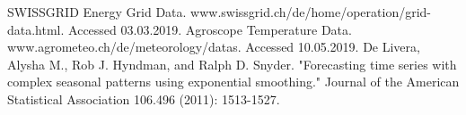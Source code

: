 \documentclass[conference]{IEEEtran}
\begin{document}
\begin{thebibliography}{00}

SWISSGRID Energy Grid Data. www.swissgrid.ch/de/home/operation/grid-data.html. Accessed 03.03.2019.
Agroscope Temperature Data. www.agrometeo.ch/de/meteorology/datas. Accessed 10.05.2019.
De Livera, Alysha M., Rob J. Hyndman, and Ralph D. Snyder. "Forecasting time series with complex seasonal patterns using exponential smoothing." Journal of the American Statistical Association 106.496 (2011): 1513-1527.


\end{thebibliography}
\end{document}
